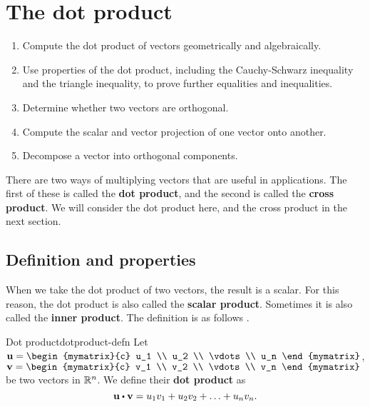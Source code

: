 \section{The dot product}

\begin{outcome}
  \begin{enumerate}
  \item Compute the dot product of vectors geometrically and
    algebraically.
  \item Use properties of the dot product, including the
    Cauchy-Schwarz inequality and the triangle inequality, to prove
    further equalities and inequalities.
  \item Determine whether two vectors are orthogonal.
  \item Compute the scalar and vector projection of one vector onto
    another.
  \item Decompose a vector into orthogonal components.
  \end{enumerate}
\end{outcome}

There are two ways of multiplying vectors that are useful in
applications. The first of these is called the \textbf{dot product},
and the second is called the \textbf{cross product}. We will consider
the dot product here, and the cross product in the next section.

\subsection{Definition and properties}

When we take the dot product of two vectors, the result is a
scalar. For this reason, the dot product is also called the
\textbf{scalar product}. Sometimes it is also called the \textbf{inner
  product}. The definition is as follows%
%
%
.

\begin{definition}{Dot product}{dotproduct-defn}
  Let $\vect{u}=\begin{mymatrix}{c}
    u_1 \\
    u_2 \\
    \vdots \\
    u_n
  \end{mymatrix}$, $\vect{v}= \begin{mymatrix}{c}
    v_1 \\
    v_2 \\
    \vdots \\
    v_n
  \end{mymatrix}$ be two vectors in $\mathbb{R}^{n}$. We
  define their \textbf{dot product} as
  \begin{equation*}
    \vect{u}\dotprod \vect{v} = u_1v_1+u_2v_2+\ldots+u_nv_n.
  \end{equation*}
\end{definition}

